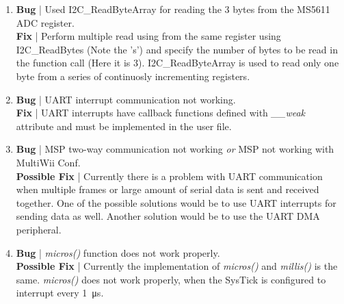 \documentclass[a4paper,12pt,oneside]{book}
\begin{document}
\begin{enumerate}
\item \textbf{Bug} | Used I2C{\_}ReadByteArray for reading the 3 bytes from the MS5611 ADC register.\\
\textbf{Fix} | Perform multiple read using from the same register using I2C{\_}ReadBytes (Note the 's') and specify the number of bytes to be read in the function call (Here it is 3). I2C{\_}ReadByteArray is used to read only one byte from a series of continuosly incrementing registers.\\

\item \textbf{Bug} | UART interrupt communication not working.\\
\textbf{Fix} | UART interrupts have callback functions defined with \textit{{\_\_}weak} attribute and must be implemented in the user file.\\

\item \textbf{Bug} | MSP two-way communication not working \textit{or} MSP not working with MultiWii Conf.\\
\textbf{Possible Fix} | Currently there is a problem with UART communication when multiple frames or large amount of serial data is sent and received together. One of the possible solutions would be to use UART interrupts for sending data as well. Another solution would be to use the UART DMA peripheral.\\

\item \textbf{Bug} | \textit{micros()} function does not work properly.\\
\textbf{Possible Fix} | Currently the implementation of \textit{micros()} and \textit{millis()} is the same. \textit{micros()} does not work properly, when the SysTick is configured to interrupt every \SI{1}{\micro\second}.\\

\end{enumerate}

\end{document}
